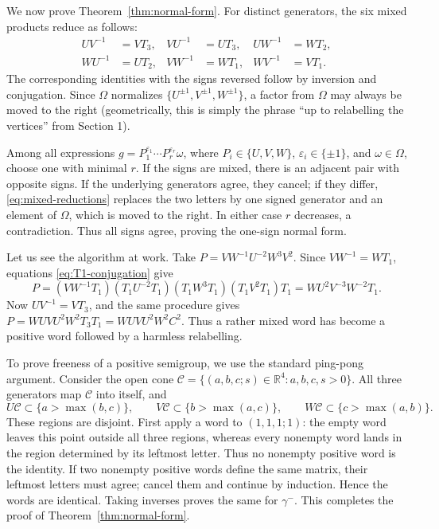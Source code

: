 \documentclass[12pt]{article}
\theoremstyle{definition}
\theoremstyle{remark}
\begin{document}
We now prove Theorem~\ref{thm:normal-form}. For distinct generators, the six
mixed products reduce as follows:
\begin{equation}\label{eq:mixed-reductions}
\begin{aligned}
UV^{-1}&=VT_3,&VU^{-1}&=UT_3,&
UW^{-1}&=WT_2,\\
WU^{-1}&=UT_2,& VW^{-1}&=WT_1,& WV^{-1}&=VT_1.
\end{aligned}
\end{equation}
The corresponding identities with the signs reversed follow by inversion
and conjugation. Since $\Omega$ normalizes
$\{U^{\pm1},V^{\pm1},W^{\pm1}\}$, a factor from $\Omega$ may always be
moved to the right (geometrically, this is simply the phrase “up to relabelling the vertices” from Section 1).

Among all expressions $g=P_1^{\varepsilon_1}\cdots
P_r^{\varepsilon_r}\omega$, where $P_i\in\{U,V,W\}$,
$\varepsilon_i\in\{\pm1\}$, and $\omega\in\Omega$, choose one with
minimal $r$. If the signs are mixed, there is an adjacent pair with opposite
signs. If the underlying generators agree, they cancel; if they differ,
\eqref{eq:mixed-reductions} replaces the two letters by one signed generator
and an element of $\Omega$, which is moved to the right. In either case
$r$ decreases, a contradiction. Thus all signs agree, proving the one-sign
normal form.

Let us see the algorithm at work. Take $P=VW^{-1}U^{-2}W^3V^2$. Since
$VW^{-1}=WT_1$, equations \eqref{eq:T1-conjugation} give
\[
P=(VW^{-1}T_1)(T_1U^{-2}T_1)(T_1W^3T_1)(T_1V^2T_1)T_1
  =WU^2V^{-3}W^{-2}T_1.
\]
Now $UV^{-1}=VT_3$, and the same procedure gives
$P=WUVU^2W^2T_3T_1=WUVU^2W^2C^2$. Thus a rather mixed word has become a
positive word followed by a harmless relabelling.

To prove freeness of a positive semigroup, we use the standard ping-pong argument. Consider the open cone $\mathcal C=\{(a,b,c;s)\in\mathbb R^4:a,b,c,s>0\}$. All three
generators map $\mathcal C$ into itself, and
\[
U\mathcal C\subset\{a>\max(b,c)\},\qquad
V\mathcal C\subset\{b>\max(a,c)\},\qquad
W\mathcal C\subset\{c>\max(a,b)\}.
\]
These regions are disjoint. First apply a word to $(1,1,1;1)$: the empty
word leaves this point outside all three regions, whereas every nonempty
word lands in the region determined by its leftmost letter. Thus no
nonempty positive word is the identity. If two nonempty positive words
define the same matrix, their leftmost letters must agree; cancel them and
continue by induction. Hence the words are identical. Taking inverses proves
the same for $\gamma^-$. This completes the proof of
Theorem~\ref{thm:normal-form}.
\end{document}
